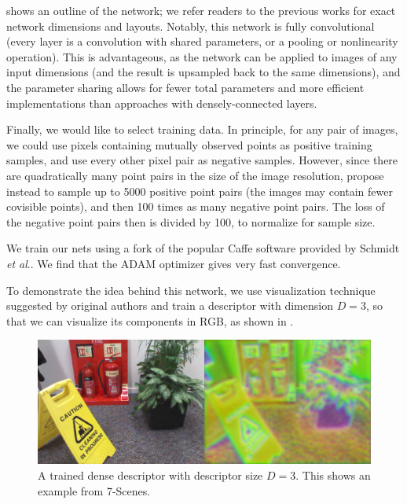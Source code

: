  shows an outline of the network; we refer readers to the previous works for exact network dimensions and layouts. Notably, this network is fully convolutional (every layer is a convolution with shared parameters, or a pooling or nonlinearity operation). This is advantageous, as the network can be applied to images of any input dimensions (and the result is upsampled back to the same dimensions), and the parameter sharing allows for fewer total parameters and more efficient implementations than approaches with densely-connected layers.

Finally, we would like to select training data. In principle, for any pair of images, we could use pixels containing mutually observed points as positive training samples, and use every other pixel pair as negative samples. However, since there are quadratically many point pairs in the size of the image resolution, \cite{schmidt2017self} propose instead to sample up to 5000 positive point pairs (the images may contain fewer covisible points), and then 100 times as many negative point pairs. The loss of the negative point pairs then is divided by 100, to normalize for sample size.

We train our nets using a fork of the popular Caffe software \cite{jia2014caffe} provided by Schmidt \textit{et al}.. We find that the ADAM optimizer gives very fast convergence.

To demonstrate the idea behind this network, we use visualization technique suggested by original authors and train a descriptor with dimension $D=3$, so that we can visualize its components in RGB, as shown in .

\begin{figure}[h]
	\centering
	\includegraphics[width=\linewidth]{methodology/descriptor_3d.png}
	\caption{A trained dense descriptor with descriptor size $D=3$. This shows an example from 7-Scenes.}
	\label{fig:descriptor_3d}
\end{figure}

